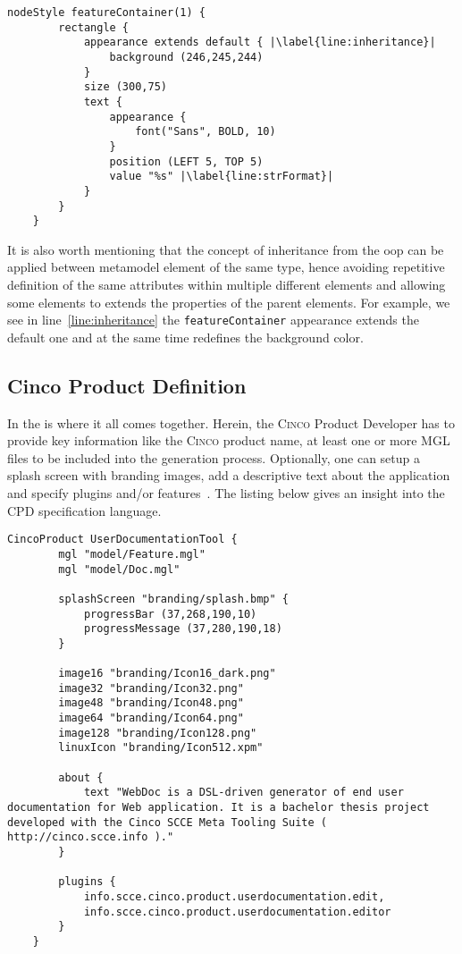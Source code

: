 \begin{lstlisting}[language=MGL, caption={Excerpt from feature.style to be applied to feature.mgl}, label=docStyle, escapechar=|, name=docMSL]
    nodeStyle featureContainer(1) {
        rectangle {
            appearance extends default { |\label{line:inheritance}|
                background (246,245,244)
            }
            size (300,75)
            text {
                appearance {
                    font("Sans", BOLD, 10)
                }
                position (LEFT 5, TOP 5)
                value "%s" |\label{line:strFormat}|
            }
        }
    }
\end{lstlisting}

It is also worth mentioning that the concept of inheritance from the \gls*{oop} can be applied between metamodel element of the same type, hence avoiding repetitive definition of the same attributes within multiple different elements and allowing some elements to extends the properties of the parent elements. For example, we see in line~\ref{line:inheritance} the \lstinline{featureContainer} appearance extends the default one and at the same time redefines the background color.

\subsection{Cinco Product Definition}\label{sec:CPD}

In the  is where it all comes together. Herein, the \textsc{Cinco} Product Developer has to provide key information like the \textsc{Cinco} product name, at least one or more MGL files to be included into the generation process. Optionally, one can setup a splash screen with branding images, add a descriptive text about the application and specify plugins and/or features~\cite{gitlabcinco}.
The listing below gives an insight into the CPD specification language.

\begin{lstlisting}[language=MGL, caption={UserDocumentationTool.cpd}]
    CincoProduct UserDocumentationTool {
        mgl "model/Feature.mgl"
        mgl "model/Doc.mgl"
        
        splashScreen "branding/splash.bmp" {
            progressBar (37,268,190,10)
            progressMessage (37,280,190,18)
        }
    
        image16 "branding/Icon16_dark.png"
        image32 "branding/Icon32.png"
        image48 "branding/Icon48.png"
        image64 "branding/Icon64.png"
        image128 "branding/Icon128.png"
        linuxIcon "branding/Icon512.xpm"
	
        about {
            text "WebDoc is a DSL-driven generator of end user documentation for Web application. It is a bachelor thesis project developed with the Cinco SCCE Meta Tooling Suite ( http://cinco.scce.info )."
        }

        plugins {
            info.scce.cinco.product.userdocumentation.edit,
            info.scce.cinco.product.userdocumentation.editor
        }
    }
\end{lstlisting}


